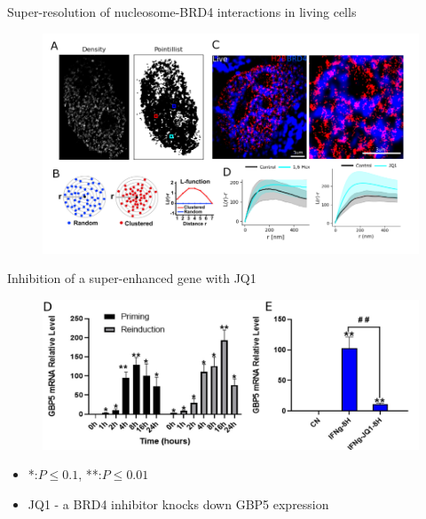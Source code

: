 \documentclass{beamer}					%
\begin{document}
\begin{frame}{Super-resolution of nucleosome-BRD4 interactions in living cells}
\begin{figure}
\includegraphics[width=13cm]{BRD4-Results.png}
\end{figure}
\end{frame}

\begin{frame}{Inhibition of a super-enhanced gene with JQ1}
\begin{figure}
\includegraphics[width=12cm]{GBP5-2.png}
\end{figure}
\begin{itemize}
\item *:$P \leq 0.1$, **:$P \leq 0.01$
\item JQ1 - a BRD4 inhibitor knocks down GBP5 expression
\end{itemize}
\end{frame}

\end{document}
